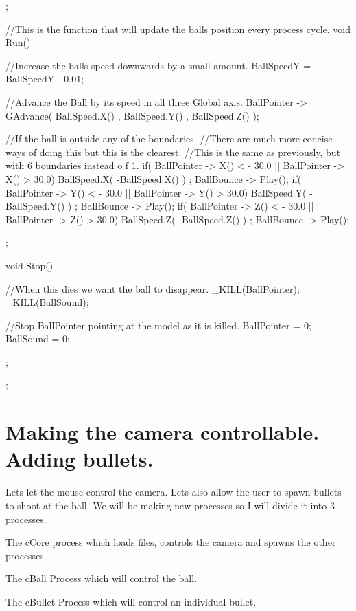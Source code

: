 \begin{DoxyCode}
{{        };

        //This is the function that will update the balls position every process 
      cycle.
        void Run()
        {
                //Increase the balls speed downwards by a small amount.
                        BallSpeedY = BallSpeedY - 0.01;

                //Advance the Ball by its speed in all three Global axis.
                        BallPointer -> GAdvance( BallSpeed.X() , BallSpeed.Y() , 
      BallSpeed.Z() );

                //If the ball is outside any of the boundaries.
                //There are much more concise ways of doing this but this is the 
      clearest.
                //This is the same as previously, but with 6 boundaries instead o
      f 1.
                if( BallPointer -> X()  < - 30.0  || BallPointer -> X() > 30.0)
                {
                        BallSpeed.X( -BallSpeed.X() ) ;
                        BallBounce -> Play();
                }
                if( BallPointer -> Y()  < - 30.0  || BallPointer -> Y() > 30.0)
                {
                        BallSpeed.Y( -BallSpeed.Y() ) ;
                        BallBounce -> Play();
                }
                if( BallPointer -> Z()  < - 30.0  || BallPointer -> Z() > 30.0)
                {
                        BallSpeed.Z( -BallSpeed.Z() ) ;
                        BallBounce -> Play();
                }

        };

        void Stop()
        {

                //When this dies we want the ball to disappear.
                        _KILL(BallPointer);
                        _KILL(BallSound);

                //Stop BallPointer pointing at the model as it is killed.
                        BallPointer = 0;
                        BallSound = 0;
        };
};
\end{DoxyCode}
 \hypertarget{_code_program_examples_BulletsBouncingBallExample}{}\section{Making the camera controllable. Adding bullets.}\label{_code_program_examples_BulletsBouncingBallExample}
Lets let the mouse control the camera. Lets also allow the user to spawn bullets to shoot at the ball. We will be making new processes so I will divide it into 3 processes.
\begin{DoxyItemize}
\item The cCore process which loads files, controls the camera and spawns the other processes.
\item The cBall Process which will control the ball.
\item The cBullet Process which will control an individual bullet.
\end{DoxyItemize}
